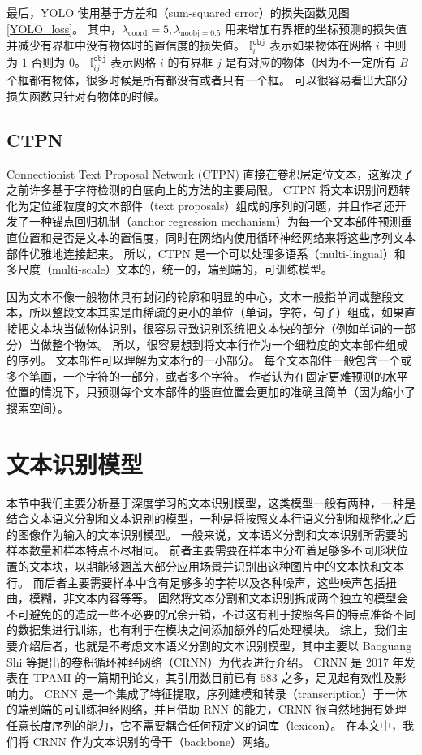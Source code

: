 最后，YOLO 使用基于方差和（sum-squared error）的损失函数见图\ref{YOLO_loss}。
其中，$\lambda_{\text{coord}} = 5, \lambda_{\text{noobj} = 0.5}$ 用来增加有界框的坐标预测的损失值并减少有界框中没有物体时的置信度的损失值。
$\mathbb{I}_i^{\texttt{obj}}$ 表示如果物体在网格 $i$ 中则为 $1$ 否则为 $0$。
$\mathbb{I}^{\texttt{obj}}_{ij}$ 表示网格 $i$ 的有界框 $j$ 是有对应的物体（因为不一定所有 $B$ 个框都有物体，很多时候是所有都没有或者只有一个框。
可以很容易看出大部分损失函数只针对有物体的时候。

\subsection{CTPN}
Connectionist Text Proposal Network (CTPN) 直接在卷积层定位文本，这解决了之前许多基于字符检测的自底向上的方法的主要局限。
CTPN 将文本识别问题转化为定位细粒度的文本部件（text proposals）组成的序列的问题，并且作者还开发了一种锚点回归机制（anchor regression mechanism）为每一个文本部件预测垂直位置和是否是文本的置信度，同时在网络内使用循环神经网络来将这些序列文本部件优雅地连接起来。
所以，CTPN 是一个可以处理多语系（multi-lingual）和多尺度（multi-scale）文本的，统一的，端到端的，可训练模型。

因为文本不像一般物体具有封闭的轮廓和明显的中心，文本一般指单词或整段文本，所以整段文本其实是由稀疏的更小的单位（单词，字符，句子）组成，如果直接把文本块当做物体识别，很容易导致识别系统把文本快的部分（例如单词的一部分）当做整个物体。
所以，很容易想到将文本行作为一个细粒度的文本部件组成的序列。
文本部件可以理解为文本行的一小部分。
每个文本部件一般包含一个或多个笔画，一个字符的一部分，或者多个字符。
作者认为在固定更难预测的水平位置的情况下，只预测每个文本部件的竖直位置会更加的准确且简单（因为缩小了搜索空间）。

\section{文本识别模型}
本节中我们主要分析基于深度学习的文本识别模型，这类模型一般有两种，一种是结合文本语义分割和文本识别的模型，一种是将按照文本行语义分割和规整化之后的图像作为输入的文本识别模型。
一般来说，文本语义分割和文本识别所需要的样本数量和样本特点不尽相同。
前者主要需要在样本中分布着足够多不同形状位置的文本块，以期能够涵盖大部分应用场景并识别出这种图片中的文本快和文本行。
而后者主要需要样本中含有足够多的字符以及各种噪声，这些噪声包括扭曲，模糊，非文本内容等等。
固然将文本分割和文本识别拆成两个独立的模型会不可避免的的造成一些不必要的冗余开销，不过这有利于按照各自的特点准备不同的数据集进行训练，也有利于在模块之间添加额外的后处理模块。
综上，我们主要介绍后者，也就是不考虑文本语义分割的文本识别模型，其中主要以 Baoguang Shi 等提出的卷积循环神经网络（CRNN）\cite{CRNN}为代表进行介绍。
CRNN 是 2017 年发表在 TPAMI 的一篇期刊论文，其引用数目前已有 $583$ 之多，足见起有效性及影响力。
CRNN 是一个集成了特征提取，序列建模和转录（transcription）于一体的端到端的可训练神经网络，并且借助 RNN 的能力，CRNN 很自然地拥有处理任意长度序列的能力，它不需要耦合任何预定义的词库（lexicon）。
在本文中，我们将 CRNN 作为文本识别的骨干（backbone）网络。

